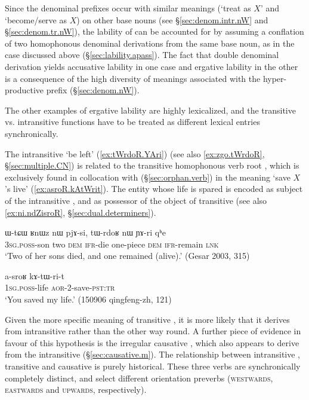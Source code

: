 Since the  denominal prefixes occur with similar  meanings (`treat as $X$' and `become/serve as $X$) on other base nouns (see §\ref{sec:denom.intr.nW} and §\ref{sec:denom.tr.nW}), the lability of  can be accounted for by assuming a conflation of two homophonous denominal derivations from the same base noun, as in the case   discussed above (§\ref{sec:lability.apass}). The fact that double denominal derivation yields accusative lability in one case and ergative lability in the other is a consequence of the high diversity of meanings associated with the hyper-productive  prefix (§\ref{sec:denom.nW}).

The other examples of ergative lability are highly lexicalized, and the transitive vs. intransitive functions have to be treated as different lexical entries synchronically.

The intransitive  `be left' (\ref{ex:tWrdoR.YAri}) (see also \ref{ex:zgo.tWrdoR}, §\ref{sec:multiple.CN}) is related to the transitive homophonous verb root , which is exclusively found in collocation with  (§\ref{sec:orphan.verb}) in the meaning `save $X$'s live' (\ref{ex:asroR.kAtWrit}). The entity whose life is spared is encoded as subject of the intransitive , and as possessor of the object  of transitive  (see also \ref{ex:ni.ndZisroR}, §\ref{sec:dual.determiners}).

\begin{exe}
\ex \label{ex:tWrdoR.YAri}
 \gll  ɯ-tɕɯ ʁnɯz nɯ pjɤ-si, tɯ-rdoʁ nɯ ɲɤ-ri qʰe \\
 \textsc{3sg}.\textsc{poss}-son two \textsc{dem} \textsc{ifr}-die one-piece \textsc{dem} \textsc{ifr}-remain \textsc{lnk} \\
\glt `Two of her sons died, and one remained (alive).' (Gesar 2003, 315)
\end{exe}

\begin{exe}
\ex \label{ex:asroR.kAtWrit}
 \gll a-sroʁ kɤ-tɯ-ri-t \\
\textsc{1sg}.\textsc{poss}-life \textsc{aor}-2-save-\textsc{pst}:\textsc{tr} \\
\glt `You saved my life.' (150906 qingfeng-zh, 121)
\end{exe}

Given the more specific meaning of transitive , it is more likely that it derives from intransitive  rather than the other way round. A further piece of evidence in favour of this hypothesis is the irregular causative , which also appears to derive from the intransitive  (§\ref{sec:causative.m}). The relationship between intransitive , transitive  and causative  is purely historical. These three verbs are synchronically completely distinct, and select different orientation preverbs (\textsc{westwards},  \textsc{eastwards} and  \textsc{upwards}, respectively).
 
